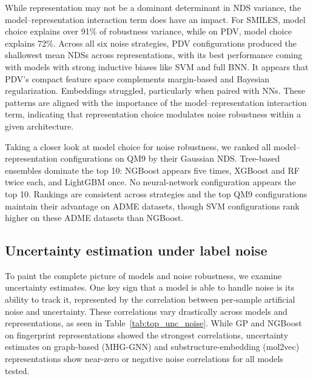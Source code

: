 \documentclass[pdflatex,sn-basic]{sn-jnl}%
\theoremstyle{thmstyleone}%
\theoremstyle{thmstyletwo}%
\theoremstyle{thmstylethree}%
\begin{document}
While representation may not be a dominant determinant in NDS variance, the model--representation interaction term does have an impact. For SMILES, model choice explains over 91\% of robustness variance, while on PDV, model choice explains 72\%. Across all six noise strategies, PDV configurations produced the shallowest mean NDSs across representations, with its best performance coming with models with strong inductive biases like SVM and full BNN. It appears that PDV's compact feature space complements margin-based and Bayesian regularization. Embeddings struggled, particularly when paired with NNs. These patterns are aligned with the importance of the model--representation interaction term, indicating that representation choice modulates noise robustness within a given architecture. 

Taking a closer look at model choice for noise robustness, we ranked all model--representation configurations on QM9 by their Gaussian NDS. Tree-based ensembles dominate the top 10: NGBoost appears five times, XGBoost and RF twice each, and LightGBM once. No neural-network configuration appears the top 10. Rankings are consistent across strategies and the top QM9 configurations maintain their advantage on ADME datasets, though SVM configurations rank higher on these ADME datasets than NGBoost.

\subsection{Uncertainty estimation under label noise}

To paint the complete picture of models and noise robustness, we examine uncertainty estimates. One key sign that a model is able to handle noise is its ability to track it, represented by the correlation between per-sample artificial noise and uncertainty. These correlations vary drastically across models and representations, as seen in Table~\ref{tab:top_unc_noise}. While GP and NGBoost on fingerprint representations showed the strongest correlations, uncertainty estimates on graph-based (MHG-GNN) and substructure-embedding (mol2vec) representations show near-zero or negative noise correlations for all models tested. 
\end{document}
